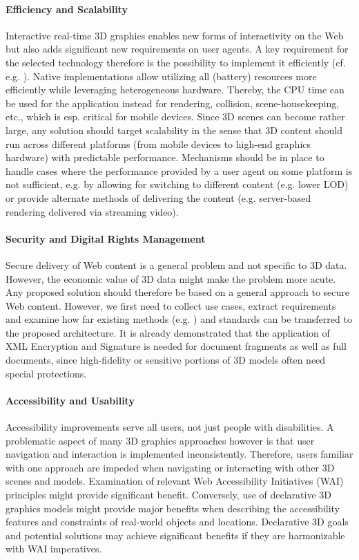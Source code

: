 \documentclass{acmsiggraph}
\begin{document}
\paragraph{Efficiency and Scalability}
Interactive real-time 3D graphics enables new forms of interactivity on the Web but also adds significant new requirements on user agents. A key requirement for the selected technology therefore is the possibility to implement it efficiently (cf. e.g. \cite{Trevett12}).
Native implementations allow utilizing all (battery) resources more efficiently while leveraging heterogeneous hardware. Thereby, the CPU time can be used for the application instead for rendering, collision, scene-housekeeping, etc., which is esp. critical for mobile devices.
Since 3D scenes can become rather large, any solution should target scalability in the sense that 3D content should run across different platforms (from mobile devices to high-end graphics hardware) with predictable performance. Mechanisms should be in place to handle cases where the performance provided by a user agent on some platform is not sufficient, e.g. by allowing for switching to different content (e.g. lower LOD) or provide alternate methods of delivering the content (e.g. server-based rendering delivered via streaming video).

\paragraph{Security and Digital Rights Management}
Secure delivery of Web content is a general problem and not specific to 3D data. However, the economic value of 3D data might make the problem more acute. Any proposed solution should therefore be based on a general approach to secure Web content. However, we first need to collect use cases, extract requirements and examine how far existing methods (e.g. \cite{KollerL05}) and standards can be transferred to the proposed architecture. It is already demonstrated that the application of XML Encryption and Signature is needed for document fragments as well as full documents, since high-fidelity or sensitive portions of 3D models often need special protections.

\paragraph{Accessibility and Usability}
Accessibility improvements serve all users, not just people with disabilities. A problematic aspect of many 3D graphics approaches however is that user navigation and interaction is implemented inconsistently. Therefore, users familiar with one approach are impeded when navigating or interacting with other 3D scenes and models. Examination of relevant Web Accessibility Initiatives (WAI) principles might provide significant benefit. Conversely, use of declarative 3D graphics models might provide major benefits when describing the accessibility features and constraints of real-world objects and locations. Declarative 3D goals and potential solutions may achieve significant benefits if they are harmonizable with WAI imperatives.
\end{document}
